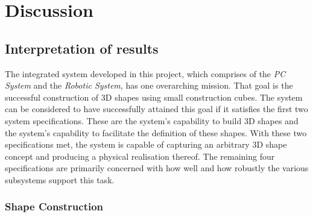 
\section{Discussion}



\subsection{Interpretation of results}


The integrated system developed in this project, which comprises of the \textit{PC System} and the \textit{Robotic System}, has one overarching mission. That goal is the successful construction of 3D shapes using small construction cubes. The system can be considered to have successfully attained this goal if it satisfies the first two system specifications. These are the system's capability to build 3D shapes and the system's capability to facilitate the definition of these shapes. With these two specifications met, the system is capable of capturing an arbitrary 3D shape concept and producing a physical realisation thereof. The remaining four specifications are primarily concerned with how well and how robustly the various subsystems support this task.

\subsubsection{Shape Construction}

